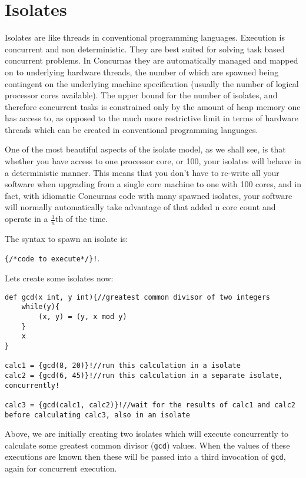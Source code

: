\documentclass[conc-doc]{subfiles}
\begin{document}
\section{Isolates}
Isolates are like threads in conventional programming languages. Execution is concurrent and non deterministic. They are best suited for solving task based concurrent problems. In Concurnas they are automatically managed and mapped on to underlying hardware threads, the number of which are spawned being contingent on the underlying machine specification (usually the number of logical processor cores available). The upper bound for the number of isolates, and therefore concurrent tasks is constrained only by the amount of heap memory one has access to, as opposed to the much more restrictive limit in terms of hardware threads which can be created in conventional programming languages.

One of the most beautiful aspects of the isolate model, as we shall see, is that whether you have access to one processor core, or 100, your isolates will behave in a deterministic manner. This means that you don't have to re-write all your software when upgrading from a single core machine to one with 100 cores, and in fact, with idiomatic Concurnas code with many spawned isolates, your software will normally automatically take advantage of that added n core count and operate in a $\frac{1}{n}$th of the time.

The syntax to spawn an isolate is: 
\begin{center}
	\lstinline!{/*code to execute*/}!\lstinline{!}. 
\end{center}

Lets create some isolates now:
\begin{lstlisting}
def gcd(x int, y int){//greatest common divisor of two integers
	while(y){
		(x, y) = (y, x mod y)
	}
	x
}

calc1 = {gcd(8, 20)}!//run this calculation in a isolate
calc2 = {gcd(6, 45)}!//run this calculation in a separate isolate, concurrently!

calc3 = {gcd(calc1, calc2)}!//wait for the results of calc1 and calc2 before calculating calc3, also in an isolate
\end{lstlisting}

Above, we are initially creating two isolates which will execute concurrently to calculate some greatest common divisor (\lstinline{gcd}) values. When the values of these executions are known then these will be passed into a third invocation of \lstinline{gcd}, again for concurrent execution.
\end{document}
